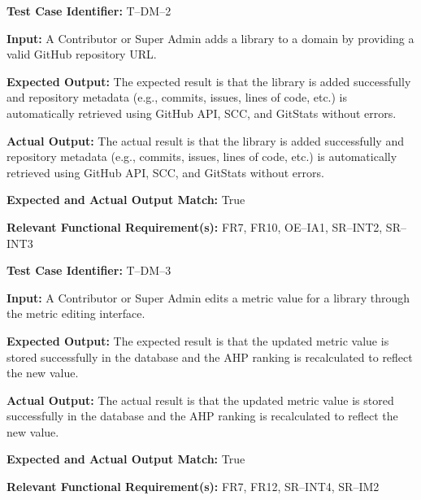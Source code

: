 \documentclass[12pt, titlepage]{article}
\begin{document}
\begin{mdframed}[linewidth=0.5mm]
\setlength{\parindent}{0pt}
\textbf{Test Case Identifier:} T--DM--2
\vspace{0.4em}

\textbf{Input:} A Contributor or Super Admin adds a library to a domain by providing a valid GitHub repository URL.
\vspace{0.4em}

\textbf{Expected Output:} The expected result is that the library is added successfully and repository metadata (e.g., commits, issues, lines of code, etc.) is automatically retrieved using GitHub API, SCC, and GitStats without errors.
\vspace{0.4em}

\textbf{Actual Output:} The actual result is that the library is added successfully and repository metadata (e.g., commits, issues, lines of code, etc.) is automatically retrieved using GitHub API, SCC, and GitStats without errors.
\vspace{0.4em}

\textbf{Expected and Actual Output Match:} True
\vspace{0.4em}

\textbf{Relevant Functional Requirement(s):} FR7, FR10, OE--IA1, SR--INT2, SR--INT3
\end{mdframed}

\begin{mdframed}[linewidth=0.5mm]
\setlength{\parindent}{0pt}
\textbf{Test Case Identifier:} T--DM--3
\vspace{0.4em}

\textbf{Input:} A Contributor or Super Admin edits a metric value for a library through the metric editing interface.
\vspace{0.4em}

\textbf{Expected Output:} The expected result is that the updated metric value is stored successfully in the database and the AHP ranking is recalculated to reflect the new value.
\vspace{0.4em}

\textbf{Actual Output:} The actual result is that the updated metric value is stored successfully in the database and the AHP ranking is recalculated to reflect the new value.
\vspace{0.4em}

\textbf{Expected and Actual Output Match:} True
\vspace{0.4em}

\textbf{Relevant Functional Requirement(s):} FR7, FR12, SR--INT4, SR--IM2
\end{mdframed}
\end{document}
